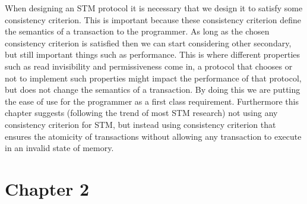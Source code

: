 When designing an STM protocol it is necessary that we design it to satisfy
some consistency criterion.
This is important because these consistency criterion define the semantics
of a transaction to the programmer.
As long as the chosen consistency criterion is satisfied then we can start considering other
secondary, but still important things such as performance.
This is where different properties such as read invisibility and permissiveness
come in, a protocol that chooses or not to implement such properties might impact
the performance of that protocol, but does not change the semantics of a transaction.
By doing this we are putting the ease of use for the programmer as a first class requirement.
Furthermore this chapter suggests (following the trend of most STM research)
not using any consistency criterion for STM, but instead
using consistency criterion that ensures the atomicity
of transactions without allowing any transaction to execute in an invalid state of memory.










\section{Chapter 2}


